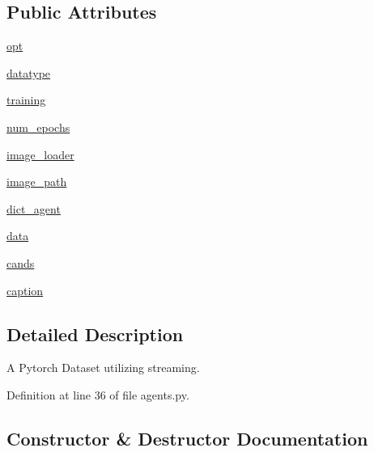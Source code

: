 \subsection*{Public Attributes}
\begin{DoxyCompactItemize}
\item 
\hyperlink{classparlai_1_1tasks_1_1flickr30k_1_1agents_1_1FlickrDataset_a0c37a007795dcd51a466d3420a3a1302}{opt}
\item 
\hyperlink{classparlai_1_1tasks_1_1flickr30k_1_1agents_1_1FlickrDataset_a0fbb201f80953f75baf8b38f685ae380}{datatype}
\item 
\hyperlink{classparlai_1_1tasks_1_1flickr30k_1_1agents_1_1FlickrDataset_a6a5e2312197fc52f45f0d036da16b788}{training}
\item 
\hyperlink{classparlai_1_1tasks_1_1flickr30k_1_1agents_1_1FlickrDataset_a2768ac48773169dee24f6b52ec36dd42}{num\+\_\+epochs}
\item 
\hyperlink{classparlai_1_1tasks_1_1flickr30k_1_1agents_1_1FlickrDataset_a49701d32271d4804b933a96f80133f8a}{image\+\_\+loader}
\item 
\hyperlink{classparlai_1_1tasks_1_1flickr30k_1_1agents_1_1FlickrDataset_aae4aad11c9ddb1cfd7ff524fabc221ee}{image\+\_\+path}
\item 
\hyperlink{classparlai_1_1tasks_1_1flickr30k_1_1agents_1_1FlickrDataset_a72d2298eb6c0b36ce7fd24352d574131}{dict\+\_\+agent}
\item 
\hyperlink{classparlai_1_1tasks_1_1flickr30k_1_1agents_1_1FlickrDataset_a4139a0775f1dc8a2363239a1df2d2463}{data}
\item 
\hyperlink{classparlai_1_1tasks_1_1flickr30k_1_1agents_1_1FlickrDataset_a04dcbf559ebf140bbdfa5ace5fee5fea}{cands}
\item 
\hyperlink{classparlai_1_1tasks_1_1flickr30k_1_1agents_1_1FlickrDataset_a64b9af8183c5ebd7cb220da70d389761}{caption}
\end{DoxyCompactItemize}


\subsection{Detailed Description}
\begin{DoxyVerb}A Pytorch Dataset utilizing streaming.
\end{DoxyVerb}
 

Definition at line 36 of file agents.\+py.



\subsection{Constructor \& Destructor Documentation}
\mbox{\label{classparlai_1_1tasks_1_1flickr30k_1_1agents_1_1FlickrDataset_a4d5c2bd105faaff6ee0d5ce0e41a6d94}} 
